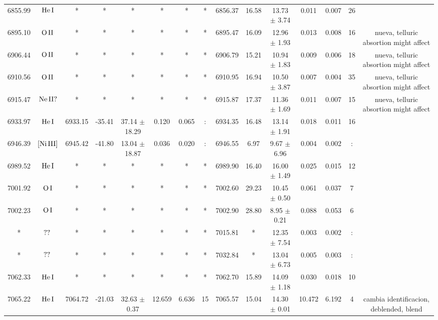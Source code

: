 \documentclass{article}
\begin{document}
\begin{table*}
\begin{adjustbox}{width=\textwidth}
\begin{tabular}{ccccccccccccccc}
6855.99 & $\mbox{He}\thinspace \mbox{I}$ & * & * & * & * & * & * & 6856.37 & 16.58 & 13.73 $\pm$ 3.74 & 0.011 & 0.007 & 26 &  \\
6895.10 & $\mbox{O}\thinspace \mbox{II}$ & * & * & * & * & * & * & 6895.47 & 16.09 & 12.96 $\pm$ 1.93 & 0.013 & 0.008 & 16 &  nueva, telluric absortion might affect \\
6906.44 & $\mbox{O}\thinspace \mbox{II}$ & * & * & * & * & * & * & 6906.79 & 15.21 & 10.94 $\pm$ 1.83 & 0.009 & 0.006 & 18 &  nueva, telluric absortion might affect \\
6910.56 & $\mbox{O}\thinspace \mbox{II}$ & * & * & * & * & * & * & 6910.95 & 16.94 & 10.50 $\pm$ 3.87 & 0.007 & 0.004 & 35 &  nueva, telluric absortion might affect \\
6915.47 & $\mbox{Ne}\thinspace \mbox{II?}$ & * & * & * & * & * & * & 6915.87 & 17.37 & 11.36 $\pm$ 1.69 & 0.011 & 0.007 & 15 &  nueva, telluric absortion might affect \\
6933.97 & $\mbox{He}\thinspace \mbox{I}$ & 6933.15 & -35.41 & 37.14 $\pm$ 18.29 & 0.120 & 0.065 & : & 6934.35 & 16.48 & 13.14 $\pm$ 1.91 & 0.018 & 0.011 & 16 &  \\
6946.39 & $\mbox{[Ni}\thinspace \mbox{III]}$ & 6945.42 & -41.80 & 13.04 $\pm$ 18.87 & 0.036 & 0.020 & : & 6946.55 & 6.97 & 9.67 $\pm$ 6.96 & 0.004 & 0.002 & : &  \\
6989.52 & $\mbox{He}\thinspace \mbox{I}$ & * & * & * & * & * & * & 6989.90 & 16.40 & 16.00 $\pm$ 1.49 & 0.025 & 0.015 & 12 &  \\
7001.92 & $\mbox{O}\thinspace \mbox{I}$ & * & * & * & * & * & * & 7002.60 & 29.23 & 10.45 $\pm$ 0.50 & 0.061 & 0.037 & 7 &  \\
7002.23 & $\mbox{O}\thinspace \mbox{I}$ & * & * & * & * & * & * & 7002.90 & 28.80 & 8.95 $\pm$ 0.21 & 0.088 & 0.053 & 6 &  \\
* & $\mbox{??}\thinspace \mbox{}$ & * & * & * & * & * & * & 7015.81 & * & 12.35 $\pm$ 7.54 & 0.003 & 0.002 & : &  \\
* & $\mbox{??}\thinspace \mbox{}$ & * & * & * & * & * & * & 7032.84 & * & 13.04 $\pm$ 6.73 & 0.005 & 0.003 & : &  \\
7062.33 & $\mbox{He}\thinspace \mbox{I}$ & * & * & * & * & * & * & 7062.70 & 15.89 & 14.09 $\pm$ 1.18 & 0.030 & 0.018 & 10 &  \\
7065.22 & $\mbox{He}\thinspace \mbox{I}$ & 7064.72 & -21.03 & 32.63 $\pm$ 0.37 & 12.659 & 6.636 & 15 & 7065.57 & 15.04 & 14.30 $\pm$ 0.01 & 10.472 & 6.192 & 4 &  cambia identificacion, deblended, blend \\

\end{tabular}
\end{adjustbox}
\end{table*}
\end{document}

